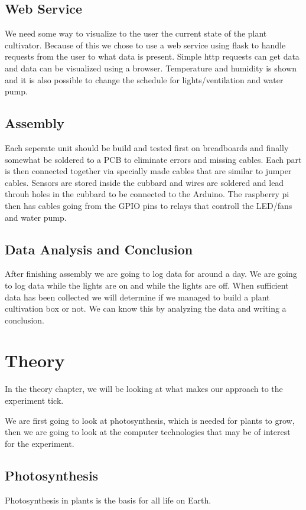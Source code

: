 \documentclass[a4paper,12pt,twoside,openright,titlepage]{book}
\begin{document}
\section{Web Service}

We need some way to visualize to the user the current state of the plant cultivator. Because of this we chose to use a web service using flask to handle requests from the user to what data is present. Simple http requests can get data and data can be visualized using a browser. Temperature and humidity is shown and it is also possible to change the schedule for lights/ventilation and water pump.

\section{Assembly}

Each seperate unit should be build and tested first on breadboards and finally somewhat be soldered to a PCB to eliminate errors and missing cables. Each part is then connected together via specially made cables that are similar to jumper cables. Sensors are stored inside the cubbard and wires are soldered and lead throuh holes in the cubbard to be connected to the Arduino. The raspberry pi then has cables going from the GPIO pins to relays that controll the LED/fans and water pump.

\section{Data Analysis and Conclusion}
After finishing assembly we are going to log data for around a day. We are going to log data while the lights are on and while the lights are off. When sufficient data has been collected we will determine if we managed to build a plant cultivation box or not. We can know this by analyzing the data and writing a conclusion.

\chapter{Theory}
In the theory chapter, we will be looking at what makes our approach to the experiment tick.

We are first going to look at photosynthesis, which is needed for plants to grow, then we are going to look at the computer technologies that may be of interest for the experiment.

\section{Photosynthesis}
Photosynthesis in plants is the basis for all life on Earth.
\end{document}
